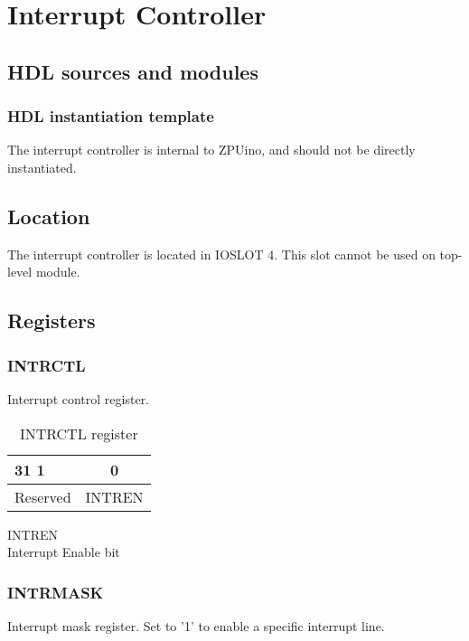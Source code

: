 \section{Interrupt Controller}
\subsection{HDL sources and modules}
\subsubsection{HDL instantiation template}
The interrupt controller is internal to ZPUino, and should not be directly instantiated.
\subsection{Location}
The interrupt controller is located in IOSLOT 4. This slot cannot be used on top-level module.
\subsection{Registers}

\subsubsection{INTRCTL}
Interrupt control register.

\begin{table}[H]
\begin{center}
\begin{tabularx}{14cm}{Xc}
31 \hfill 1 & 0 \\

\hline
\multicolumn{1}{|c|}{Reserved} &
\multicolumn{1}{|c|}{INTREN}  \\

\hline
\end{tabularx}
\caption{INTRCTL register}
\end{center}
\end{table}

\begin{description}
\item{INTREN} \hfill \\ Interrupt Enable bit
\end{description}

\subsubsection{INTRMASK}
Interrupt mask register. Set to '1' to enable a specific interrupt line.

